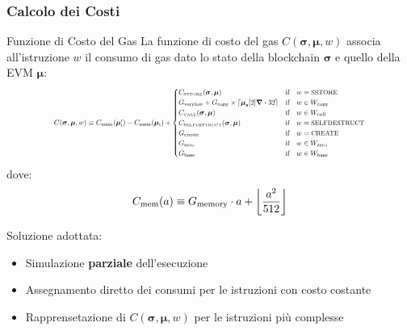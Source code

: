 \documentclass{beamer}
\begin{document}
\begin{frame}
    \frametitle{Calcolo dei Costi}
    \begin{block}{Funzione di Costo del Gas}
    La funzione di costo del gas $C(\boldsymbol{\sigma}, \boldsymbol{\mu}, w)$ associa all'istruzione $w$ il consumo di gas dato lo stato della blockchain $\boldsymbol{\sigma}$ e quello della EVM $\boldsymbol{\mu}$:
    \begin{equation*}
    \resizebox{.8\textwidth}{!}
    {$
    C(\boldsymbol{\sigma}, \boldsymbol{\mu}, w) \equiv C_{\mathrm{mem}}(\boldsymbol{\mu}'_{\mathrm{i}})-C_{\mathrm{mem}}(\boldsymbol{\mu}_{\mathrm{i}}) + 
    \begin{cases}
    C_\text{\tiny SSTORE}(\boldsymbol{\sigma}, \boldsymbol{\mu}) & \text{if} \quad w = \text{\small SSTORE} \\
    G_{\mathrm{verylow}} + G_{\mathrm{copy}}\times\lceil\boldsymbol{\mu}_{\mathbf{s}}[2] \div 32\rceil & \text{if} \quad w \in W_{\mathrm{copy}} \\
    C_\text{\tiny CALL}(\boldsymbol{\sigma}, \boldsymbol{\mu}) & \text{if} \quad w \in W_{\mathrm{call}} \\
    C_\text{\tiny SELFDESTRUCT}(\boldsymbol{\sigma}, \boldsymbol{\mu}) & \text{if} \quad w = \text{\small SELFDESTRUCT} \\
    G_{\mathrm{create}} & \text{if} \quad w = \text{\small CREATE}\\
    G_{\mathrm{zero}} & \text{if} \quad w \in W_{\mathrm{zero}}\\
    G_{\mathrm{base}} & \text{if} \quad w \in W_{\mathrm{base}}
    \end{cases}
    $}
    \end{equation*}
    dove:
    \begin{equation*}
    \resizebox{.4\textwidth}{!}
    {$
    C_{\mathrm{mem}}(a) \equiv G_{\mathrm{memory}} \cdot a + \left\lfloor \dfrac{a^2}{512} \right\rfloor
    $}
    \end{equation*}
    \end{block}
    Soluzione adottata:
    \begin{itemize}
        \item Simulazione \textbf{parziale} dell'esecuzione
        \item Assegnamento diretto dei consumi per le istruzioni con costo costante
        \item Rapprensetazione di $C(\boldsymbol{\sigma}, \boldsymbol{\mu}, w)$ per le istruzioni pi\`{u} complesse
    \end{itemize}
\end{frame}
\end{document}
